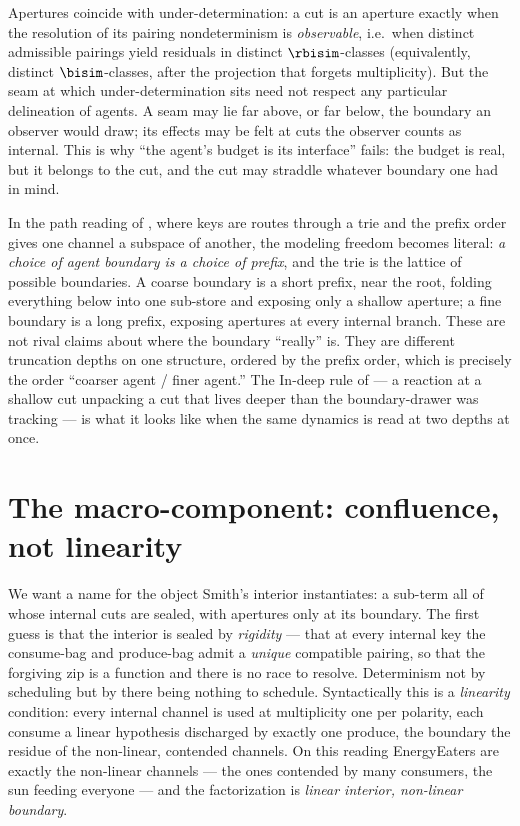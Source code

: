 \begin{remark}\label{ndo:rmk:seam}
Apertures coincide with under-determination: a cut is an aperture exactly when the
resolution of its pairing nondeterminism is \emph{observable}, i.e.\ when distinct
admissible pairings yield residuals in distinct $\rbisim$-classes (equivalently,
distinct $\bisim$-classes, after the projection that forgets multiplicity). But
the seam at which under-determination sits need not respect any particular
delineation of agents. A seam may lie far above, or far below, the boundary an
observer would draw; its effects may be felt at cuts the observer counts as
internal. This is why ``the agent's budget is its interface'' fails: the budget is
real, but it belongs to the cut, and the cut may straddle whatever boundary one
had in mind.
\end{remark}

In the path reading of \cite{paths}, where keys are routes through a trie and the
prefix order gives one channel a subspace of another, the modeling freedom
becomes literal: \emph{a choice of agent boundary is a choice of prefix}, and the
trie is the lattice of possible boundaries. A coarse boundary is a short prefix,
near the root, folding everything below into one sub-store and exposing only a
shallow aperture; a fine boundary is a long prefix, exposing apertures at every
internal branch. These are not rival claims about where the boundary ``really''
is. They are different truncation depths on one structure, ordered by the prefix
order, which is precisely the order ``coarser agent / finer agent.'' The In-deep
rule of \cite{paths} --- a reaction at a shallow cut unpacking a cut that lives
deeper than the boundary-drawer was tracking --- is what it looks like when the
same dynamics is read at two depths at once.


\section{The macro-component: confluence, not linearity}\label{ndo:sec:macro}

We want a name for the object Smith's interior instantiates: a sub-term all of
whose internal cuts are sealed, with apertures only at its boundary. The first
guess is that the interior is sealed by \emph{rigidity} --- that at every internal
key the consume-bag and produce-bag admit a \emph{unique} compatible pairing, so
that the forgiving zip is a function and there is no race to resolve. Determinism
not by scheduling but by there being nothing to schedule. Syntactically this is a
\emph{linearity} condition: every internal channel is used at multiplicity one per
polarity, each consume a linear hypothesis discharged by exactly one produce, the
boundary the residue of the non-linear, contended channels. On this reading
\textsf{EnergyEaters} are exactly the non-linear channels --- the ones contended by
many consumers, the sun feeding everyone --- and the factorization is
\emph{linear interior, non-linear boundary}.

